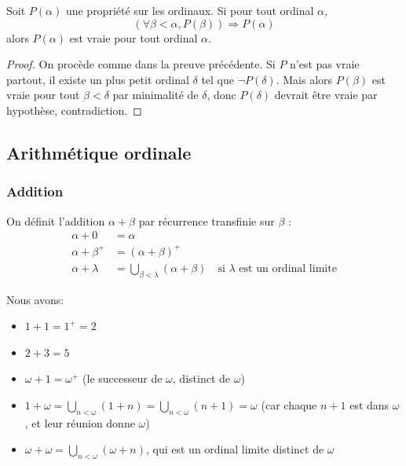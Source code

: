 \begin{theoreme}\label{thm:induction_transfinie}
	Soit $P(\alpha)$ une propriété sur les ordinaux. Si pour tout ordinal $\alpha$,
	$$\left(\forall \beta < \alpha, P(\beta)\right) \Rightarrow P(\alpha)$$
	alors $P(\alpha)$ est vraie pour tout ordinal $\alpha$.
\end{theoreme}

\begin{proof}
	On procède comme dans la preuve précédente. Si $P$ n'est pas vraie partout, il existe un plus petit ordinal $\delta$ tel que $\neg P(\delta)$. Mais alors $P(\beta)$ est vraie pour tout $\beta < \delta$ par minimalité de $\delta$, donc $P(\delta)$ devrait être vraie par hypothèse, contradiction.
\end{proof}

\subsection{Arithmétique ordinale}

\subsubsection*{Addition}

\begin{definition}
	On définit l'addition $\alpha + \beta$ par récurrence transfinie sur $\beta$ :
	\begin{align*}
		\alpha + 0       & = \alpha                                                                                     \\
		\alpha + \beta^+ & = (\alpha + \beta)^+                                                                         \\
		\alpha + \lambda & = \bigcup_{\beta < \lambda} (\alpha + \beta) \quad \text{si $\lambda$ est un ordinal limite}
	\end{align*}
\end{definition}

\begin{exemple}
Nous avons:
	\begin{itemize}
		\item $1 + 1 = 1^+ = 2$
		\item $2 + 3 = 5$
		\item $\omega + 1 = \omega^+$ (le successeur de $\omega$, distinct de $\omega$)
		\item $1 + \omega = \bigcup_{n < \omega} (1 + n) = \bigcup_{n < \omega} (n + 1) = \omega$ (car chaque $n+1$ est dans $\omega$, et leur réunion donne $\omega$)
		\item $\omega + \omega = \bigcup_{n < \omega} (\omega + n)$, qui est un ordinal limite distinct de $\omega$
	\end{itemize}
\end{exemple}

